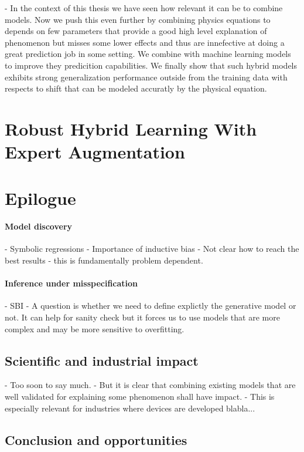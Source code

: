 - In the context of this thesis we have seen how relevant it can be to combine models. Now we push this even further by combining physics equations to depends on few parameters that provide a good high level explanation of  phenomenon but misses some lower effects and thus are innefective at doing a great prediction job in some setting. We combine with machine learning models to improve they predicition capabilities. We finally show that such hybrid models exhibits strong generalization performance outside from the training data with respects to shift that can be modeled accuratly by the physical equation.

\section{Robust Hybrid Learning With Expert Augmentation}


\section{Epilogue}

\paragraph{Model discovery}
- Symbolic regressions
- Importance of inductive bias
- Not clear how to reach the best results - this is fundamentally problem dependent.
\paragraph{Inference under misspecification}
 - SBI
 - A question is whether we need to define explictly the generative model or not. It can help for sanity check but it forces us to use models that are more complex and may be more sensitive to overfitting.
\subsection{Scientific and industrial impact}
 - Too soon to say much.
 - But it is clear that combining existing models that are well validated for explaining some phenomenon shall have impact.
 - This is especially relevant for industries where devices are developed blabla...
\subsection{Conclusion and opportunities}
